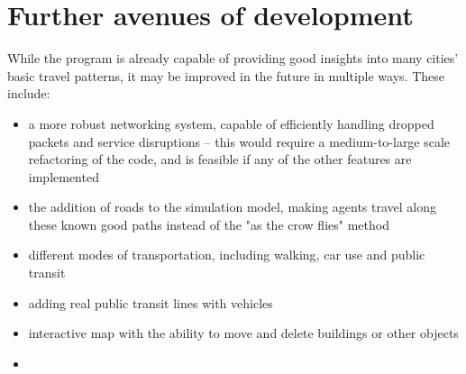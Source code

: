 \chapter{Further avenues of development}

While the program is already capable of providing good insights into many cities' basic travel patterns, it may be improved in the future in multiple ways. These include:
\begin{itemize}
    \item a more robust networking system, capable of efficiently handling dropped packets and service disruptions -- this would require a medium-to-large scale refactoring of the code, and is feasible if any of the other features are implemented
    \item the addition of roads to the simulation model, making agents travel along these known good paths instead of the "as the crow flies" method
    \item different modes of transportation, including walking, car use and public transit
    \item adding real public transit lines with vehicles 
    \item interactive map with the ability to move and delete buildings or other objects
    \item 
\end{itemize}